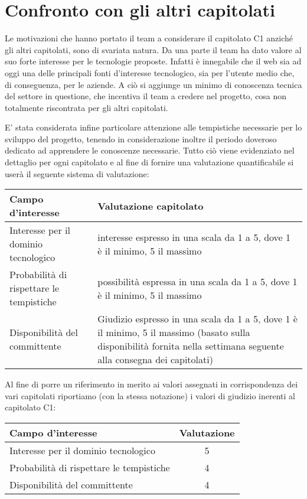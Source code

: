 \section{Confronto con gli altri capitolati}
Le motivazioni che hanno portato il team a considerare il capitolato C1 anziché gli altri capitolati, sono di svariata natura. Da una parte il team ha dato valore al suo forte interesse per le tecnologie proposte. Infatti è innegabile che il web sia ad oggi una delle principali fonti d'interesse tecnologico, sia per l'utente medio che, di conseguenza, per le aziende. A ciò si aggiunge un minimo di conoscenza tecnica del settore in questione, che incentiva il team a credere nel progetto, cosa non totalmente riscontrata per gli altri capitolati. 

E' stata considerata infine particolare attenzione alle tempistiche necessarie per lo sviluppo del progetto, tenendo in considerazione inoltre il periodo doveroso dedicato ad apprendere le conoscenze necessarie. Tutto ciò viene evidenziato nel dettaglio per ogni capitolato e al fine di fornire una valutazione quantificabile si userà il seguente sistema di valutazione:\\

\begin{center}
\begin{tabularx}{.9\textwidth}{lX}
\toprule
Campo d'interesse & Valutazione capitolato\\
\midrule %
Interesse per il dominio tecnologico & interesse espresso in una scala da 1 a 5, dove 1 è il minimo, 5 il massimo\\
Probabilità di rispettare le tempistiche & possibilità espressa in una scala da 1 a 5, dove 1 è il minimo, 5 il massimo\\
Disponibilità del committente & Giudizio espresso in una scala da 1 a 5, dove 1 è il minimo, 5 il massimo (basato sulla disponibilità fornita nella settimana seguente alla consegna dei capitolati)\\
\bottomrule
\end{tabularx}
\end{center}

Al fine di porre un riferimento in merito ai valori assegnati in corrispondenza dei vari capitolati  riportiamo (con la stessa notazione) i valori di giudizio inerenti al capitolato C1:

\begin{center}
\begin{tabular}{lc}
\toprule
Campo d'interesse & Valutazione\\
\midrule %
Interesse per il dominio tecnologico & 5\\
Probabilità di rispettare le tempistiche & 4\\
Disponibilità del committente & 4\\
\bottomrule
\end{tabular}
\end{center}


